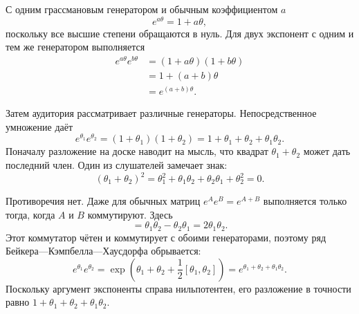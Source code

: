 С одним грассмановым генератором и обычным коэффициентом \(a\)
\begin{equation}
e^{a\theta}
=1+a\theta,
\end{equation}
поскольку все высшие степени обращаются в нуль. Для двух экспонент с одним и тем же генератором выполняется
\begin{align}
e^{a\theta}e^{b\theta}
&=(1+a\theta)(1+b\theta)\\
&=1+(a+b)\theta\\
&=e^{(a+b)\theta}.
\end{align}

Затем аудитория рассматривает различные генераторы. Непосредственное умножение даёт
\begin{equation}
e^{\theta_1}e^{\theta_2}
=(1+\theta_1)(1+\theta_2)
=1+\theta_1+\theta_2+\theta_1\theta_2.
\end{equation}
Поначалу разложение на доске наводит на мысль, что квадрат \(\theta_1+\theta_2\) может дать последний член. Один из слушателей замечает знак:
\begin{equation}
(\theta_1+\theta_2)^2
=\theta_1^2+\theta_1\theta_2
 +\theta_2\theta_1+\theta_2^2
=0.
\end{equation}

\begin{classroomqa}
\end{classroomqa}

Противоречия нет. Даже для обычных матриц \(e^Ae^B=e^{A+B}\) выполняется только тогда, когда \(A\) и \(B\) коммутируют. Здесь
\begin{equation}
[\theta_1,\theta_2]
=\theta_1\theta_2-\theta_2\theta_1
=2\theta_1\theta_2.
\end{equation}
Этот коммутатор чётен и коммутирует с обоими генераторами, поэтому ряд Бейкера—Кэмпбелла—Хаусдорфа обрывается:
\begin{equation}
e^{\theta_1}e^{\theta_2}
=\exp\left(
\theta_1+\theta_2+\frac12[\theta_1,\theta_2]
\right)
=e^{\theta_1+\theta_2+\theta_1\theta_2}.
\end{equation}
Поскольку аргумент экспоненты справа нильпотентен, его разложение в точности равно
\(1+\theta_1+\theta_2+\theta_1\theta_2\). 

